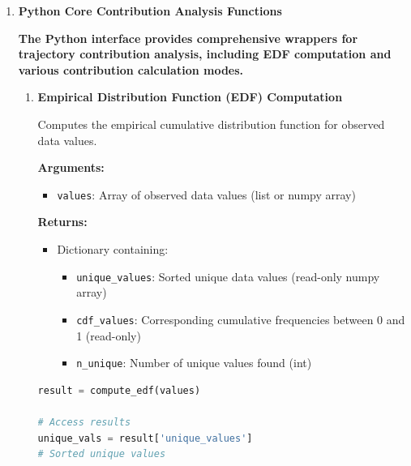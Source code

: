 \begin{enumerate}
    \item \textbf{Python Core Contribution Analysis Functions}
          
          \textbf{The Python interface provides comprehensive wrappers for
            trajectory contribution analysis, including EDF computation and various contribution
          calculation modes.}
          
          \begin{enumerate}
            \item \textbf{Empirical Distribution Function (EDF) Computation}
                  
                  Computes the empirical cumulative distribution function for observed data
                  values.
                  
                  \textbf{Arguments:}
                  \begin{itemize}
                    \item \texttt{values}: Array of observed data values (list or numpy
                          array)
                  \end{itemize}
                  \textbf{Returns:}
                  \begin{itemize}
                    \item Dictionary containing:
                          \begin{itemize}
                            \item \texttt{unique\_values}: Sorted unique data values (read-only
                                  numpy array)
                                  
                            \item \texttt{cdf\_values}: Corresponding cumulative frequencies
                                  between 0 and 1 (read-only)
                                  
                            \item \texttt{n\_unique}: Number of unique values found (int)
                          \end{itemize}
                  \end{itemize}
                  \begin{lstlisting}[language=Python, caption={Empirical Distribution Function Computation}]
result = compute_edf(values)

# Access results
unique_vals = result['unique_values']  
# Sorted unique values


\end{lstlisting}
\end{enumerate}
\end{enumerate}
